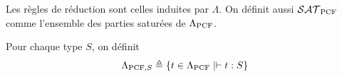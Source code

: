 \documentclass{article}
\begin{document}
\begin{defi}[$\LamP$]
\begin{center}
    \begin{prooftree}
    \end{prooftree}
    \quad
    \begin{prooftree}
    \end{prooftree}
    \quad
    \begin{prooftree}
    \end{prooftree}

    \vspace{0.5cm}

    \begin{prooftree}
    \end{prooftree}
    \quad
    \begin{prooftree}
    \end{prooftree}
    \quad
    \begin{prooftree}
    \end{prooftree}

    \vspace{0.5cm}
    
    \begin{prooftree}
    \end{prooftree}
    \quad
    \begin{prooftree}
    \end{prooftree}
    \quad
    \begin{prooftree}
    \end{prooftree}
  \end{center}

  Les règles de réduction sont celles induites par $\Lambda$. On définit aussi $\SATP$ comme l'ensemble des parties saturées de $\LamP$.

  Pour chaque type $S$, on définit
  \[\LamS{S}\defeq \{t\in\LamP\mid \vdash t : S\}\]
\end{defi}
\end{document}
